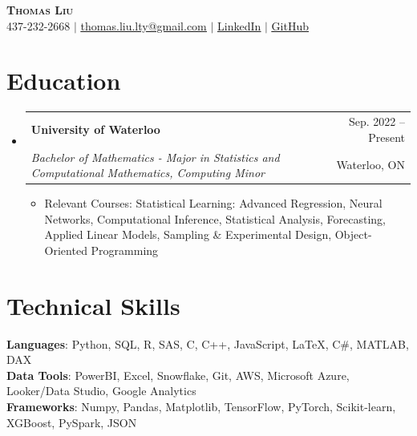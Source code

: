 \documentclass[letterpaper,11pt]{article}
\makeatletter
\newcommand{\resumeEducation}[4]{
  \vspace{-2pt}\item
    \begin{tabular*}{0.97\textwidth}[t]{l@{\extracolsep{\fill}}r}
      \textbf{#1} & #2 \\
      \small#3 & \small #4 \\
    \end{tabular*}\vspace{-2pt}
}
\newcommand{\resumeSubHeadingListStart}{\begin{itemize}[leftmargin=0.15in, label={}]}
\newcommand{\resumeSubHeadingListEnd}{\end{itemize}}
\makeatother
\begin{document}
\begin{center}
    \textbf{\Huge \scshape Thomas Liu} \\ \vspace{-1pt}
    \small 437-232-2668 $|$ \href{mailto:thomas.liu.lty@gmail.com}{\underline{thomas.liu.lty@gmail.com}} $|$ 
    \faLinkedinSquare \href{https://www.linkedin.com/in/thomas-liu-a93206236/}{\underline{LinkedIn}} $|$
    \faGithub \href{https://github.com/ThomasLiuuu}{\underline{GitHub}}
\end{center}

\section{Education}
  \resumeSubHeadingListStart
    \resumeEducation 
      {University of Waterloo}{Sep. 2022 -- Present}
      {\textit{Bachelor of Mathematics - Major in Statistics and Computational Mathematics, Computing Minor}}{Waterloo, ON}
      \vspace{-8pt}
      \begin{itemize}[leftmargin=15pt]
        \item \small{Relevant Courses: Statistical Learning: Advanced Regression, Neural Networks, Computational Inference, Statistical Analysis, Forecasting, Applied Linear Models, Sampling \& Experimental Design, Object-Oriented Programming}
      \end{itemize}
  \resumeSubHeadingListEnd

\vspace{-15pt}
\section{Technical Skills}
 \begin{itemize}[leftmargin=0.15in, label={}]
    \small{\item{
     \textbf{Languages}{: Python, SQL, R, SAS, C, C++, JavaScript, LaTeX, C\#, MATLAB, DAX} \\
     \textbf{Data Tools}{: PowerBI, Excel, Snowflake, Git, AWS, Microsoft Azure, Looker/Data Studio, Google Analytics} \\
     \textbf{Frameworks}{: Numpy, Pandas, Matplotlib, TensorFlow, PyTorch, Scikit-learn, XGBoost, PySpark, JSON} 
    }}
 \end{itemize}
\end{document}
